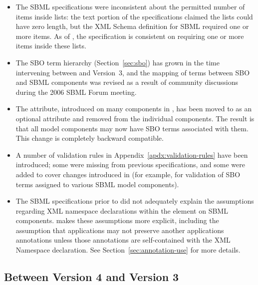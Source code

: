 \begin{itemize}
\item The SBML specifications were inconsistent about the
  permitted number of items inside
   lists: the text portion of the
  specifications claimed the lists could have zero length, but the
  XML Schema definition for SBML required one or more items.  As
  of \sbmltwothree, the specification is consistent on requiring
  one or more items inside these lists.

\item The SBO term hierarchy (Section~\ref{sec:sbo}) has grown in
  the time intervening between \sbmltwotwo and Version~3, and the
  mapping of terms between SBO and SBML components was revised as
  a result of community discussions during the 2006 SBML Forum
  meeting.

\item The  attribute, introduced on many components in
  \sbmltwotwo, has been moved to \SBase as an optional attribute
  and removed from the individual components.  The result is that
  all model components may now have SBO terms associated with
  them.  This change is completely backward compatible.

\item A number of validation rules in
  Appendix~\ref{apdx:validation-rules} have been introduced; some
  were missing from previous specifications, and some were added
  to cover changes introduced in \sbmltwothree (for example, for
  validation of SBO terms assigned to various SBML model
  components).

\item The SBML specifications prior to \sbmltwothree did not
  adequately explain the assumptions regarding XML namespace
  declarations within the  element on SBML
  components.  \sbmltwothree makes these assumptions more
  explicit, including the assumption that applications may not
  preserve another applications annotations unless those
  annotations are self-contained with the XML Namespace
  declaration.  See Section~\ref{sec:annotation-use} for more
  details.

\end{itemize}


\renewcommand{\thesubsection}{\Alph{section}.\arabic{subsection}}

\subsection{Between Version 4 and Version 3}

